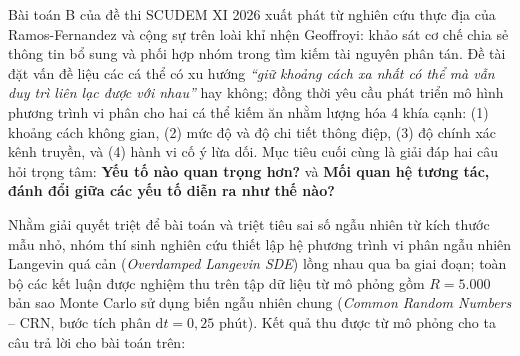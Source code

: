 \documentclass[11pt,a4paper]{report}
\newcommand{\dd}{\mathrm{d}}
\begin{document}
Bài toán B của đề thi SCUDEM XI 2026 xuất phát từ nghiên cứu thực địa của Ramos-Fernandez và cộng sự trên loài khỉ nhện Geoffroyi: khảo sát cơ chế chia sẻ thông tin bổ sung và phối hợp nhóm trong tìm kiếm tài nguyên phân tán. Đề tài đặt vấn đề liệu các cá thể có xu hướng \textit{“giữ khoảng cách xa nhất có thể mà vẫn duy trì liên lạc được với nhau”} hay không; đồng thời yêu cầu phát triển mô hình phương trình vi phân cho hai cá thể kiếm ăn nhằm lượng hóa 4 khía cạnh: (1) khoảng cách không gian, (2) mức độ và độ chi tiết thông điệp, (3) độ chính xác kênh truyền, và (4) hành vi cố ý lừa dối. Mục tiêu cuối cùng là giải đáp hai câu hỏi trọng tâm: \textbf{Yếu tố nào quan trọng hơn?} và \textbf{Mối quan hệ tương tác, đánh đổi giữa các yếu tố diễn ra như thế nào?}

Nhằm giải quyết triệt để bài toán và triệt tiêu sai số ngẫu nhiên từ kích thước mẫu nhỏ, nhóm thí sinh nghiên cứu thiết lập hệ phương trình vi phân ngẫu nhiên Langevin quá cản (\textit{Overdamped Langevin SDE}) lồng nhau qua ba giai đoạn; toàn bộ các kết luận được nghiệm thu trên tập dữ liệu từ mô phỏng gồm $R = 5.000$ bản sao Monte Carlo sử dụng biến ngẫu nhiên chung (\textit{Common Random Numbers} -- CRN, bước tích phân $\dd t = 0{,}25\text{ phút}$). Kết quả thu được từ mô phỏng cho ta câu trả lời cho bài toán trên:
\end{document}
